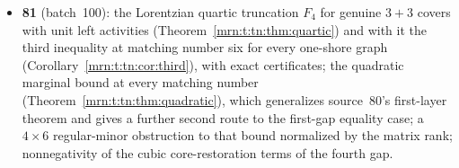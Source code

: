 \documentclass[11pt,a4paper]{article}
\theoremstyle{remark}\newtheorem{remark}[theorem]{Remark}
\newcommand{\prp}{\emph{preorder-root-polytopes}}
\begin{document}
\begin{itemize}
  (Theorem~\ref{mrn:v:tt:thm:PSD}) and with it a certificate-free proof of
  source~10's three-vertex theorem; an abstract three-element obstruction and
  two thirteen-vertex graph obstructions to three-tail Lorentzian lifts; the
  union proof of source~79's theorem; two further numerical instances of
  \prp's rank-six family.
\item \textbf{81} (batch~100): the Lorentzian quartic truncation $F_4$ for
  genuine $3+3$ covers with unit left activities
  (Theorem~\ref{mrn:t:tn:thm:quartic}) and with it the third inequality at
  matching number six for every one-shore graph
  (Corollary~\ref{mrn:t:tn:cor:third}), with exact certificates; the
  quadratic marginal bound at every matching number
  (Theorem~\ref{mrn:t:tn:thm:quadratic}), which generalizes source~80's
  first-layer theorem and gives a further second route to the first-gap
  equality case; a $4\times6$ regular-minor obstruction to that bound
  normalized by the matrix rank; nonnegativity of the cubic core-restoration
  terms of the fourth gap.
\end{itemize}
\end{document}
